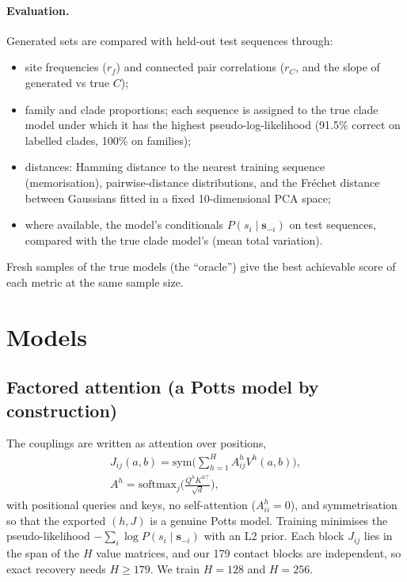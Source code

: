 \documentclass[10pt,a4paper,twocolumn]{article}
\begin{document}
\paragraph{Evaluation.} Generated sets are compared with held-out test sequences through:
\begin{itemize}
\item site frequencies ($r_f$) and connected pair correlations ($r_C$, and the slope of generated vs true $C$);
\item family and clade proportions; each sequence is assigned to the true clade model under which it has the
highest pseudo-log-likelihood (91.5\% correct on labelled clades, 100\% on families);
\item distances: Hamming distance to the nearest training sequence (memorisation), pairwise-distance distributions,
and the Fréchet distance between Gaussians fitted in a fixed 10-dimensional PCA space;
\item where available, the model's conditionals $P(s_i\mid\bm s_{-i})$ on test sequences, compared with the true
clade model's (mean total variation).
\end{itemize}
Fresh samples of the true models (the ``oracle'') give the best achievable score of each metric at the same sample
size.

\section{Models}
\subsection{Factored attention (a Potts model by construction)}
The couplings are written as attention over positions,
\begin{gather*}
J_{ij}(a,b)=\mathrm{sym}\Big(\sum_{h=1}^HA^h_{ij}V^h(a,b)\Big),\\
A^h=\mathrm{softmax}_j\!\Big(\frac{Q^hK^{h\top}}{\sqrt d}\Big),
\end{gather*}
with positional queries and keys, no self-attention ($A^h_{ii}=0$), and symmetrisation so that the exported $(h,J)$
is a genuine Potts model. Training minimises the pseudo-likelihood
$-\sum_i\log P(s_i\mid\bm s_{-i})$ with an L2 prior. Each block $J_{ij}$ lies in the span of the $H$ value matrices,
and our 179 contact blocks are independent, so exact recovery needs $H\ge179$. We train $H=128$ and $H=256$.
\end{document}
